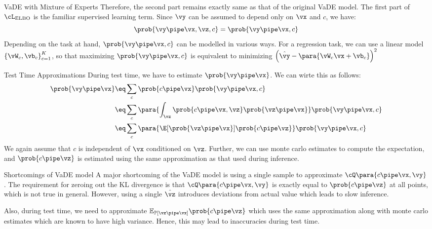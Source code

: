 \documentclass{article}
\begin{document}
\begin{psection}{VaDE with Mixture of Experts}
	Therefore, the second part remains exactly same as that of the original VaDE model. The first part of $\cL_{\text{ELBO}}$ is the familiar supervised learning term. Since $\vy$ can be assumed to depend only on $\vx$ and $c$, we have:
	$$ \prob{\vy \pipe \vx, \vz, c} = \prob{\vy \pipe \vx, c} $$
	Depending on the task at hand, $\prob{\vy \pipe \vx, c}$ can be modelled in various ways. For a regression task, we can use a linear model $\left\{ \vW_c, \vb_c \right\}_{c=1}^{K}$, so that maximizing $\prob{\vy \pipe \vx, c}$ is equivalent to minimizing $ \left(\hat{\vy} - \para{\vW_c\vx + \vb_c}\right)^2$

	\begin{psubsection}{Test Time Approximations}
		During test time, we have to estimate $\prob{\vy \pipe \vx}$. We can wirte this as follows:
		\begin{align*}
			\prob{\vy \pipe \vx} &\eq \sum_c \prob{c\pipe\vx}\prob{\vy \pipe \vx, c} \\
			&\eq \sum_c \para{\int_{\vz} \prob{c\pipe\vx, \vz}\prob{\vz \pipe \vx}}\prob{\vy \pipe \vx, c}\\
			&\eq \sum_c \para{\E[\prob{\vz \pipe \vx}]{\prob{c\pipe\vz}}}\prob{\vy \pipe \vx, c}
		\end{align*}
		We again assume that $c$ is independent of $\vx$ conditioned on $\vz$. Further, we can use monte carlo estimates to compute the expectation, and $\prob{c\pipe\vz}$ is estimated using the same approximation as that used during inference.
	\end{psubsection}

	\begin{psubsection}{Shortcomings of VaDE model}
		A major shortcoming of the VaDE model is using a single sample to approximate $\cQ\para{c \pipe \vx, \vy}$. The requirement for zeroing out the KL divergence is that $\cQ\para{c \pipe \vx, \vy}$ is exactly equal to $\prob{c \pipe \vz}$ at all points, which is not true in general. However, using a single $\hat{\vz}$ introduces deviations from actual value which leads to slow inference.

		Also, during test time, we need to approximate $\mathbb{E}_{\mathbb{P}[\vz \pipe \vx]}{\prob{c\pipe\vz}}$ which uses the same approximation along with monte carlo estimates which are known to have high variance. Hence, this may lead to inaccuracies during test time.
	\end{psubsection}
\end{psection}
\end{document}
